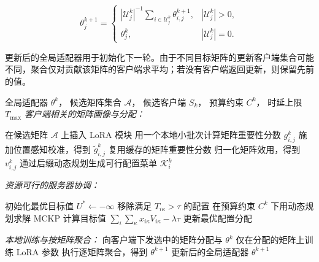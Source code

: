 \documentclass[10pt,conference,letterpaper]{IEEEtran}
\newcommand{\method}{FedMATRIX-LoRA}
\begin{document}
\begin{equation}
 \theta_j^{k+1}
 =
 \begin{cases}
 |\mathcal U_j^k|^{-1}
 \displaystyle\sum_{i\in \mathcal U_j^k}
 \theta_{i,j}^{k+1},
 &
 |\mathcal U_j^k|>0,
 \\[6pt]
 \theta_j^k,
 &
 |\mathcal U_j^k|=0 .
 \end{cases}
 \label{eq:aggregation}
\end{equation}

更新后的全局适配器用于初始化下一轮。由于不同目标矩阵的更新客户端集合可能不同，聚合仅对贡献该矩阵的客户端求平均；若没有客户端返回更新，则保留先前的值。
\begin{algorithm}[t]
\caption{通信轮次 $k$ 中的 \method{}}
\label{alg:fedmatrix}
\footnotesize
\begin{algorithmic}[1]
\Require
全局适配器 \(\theta^k\)，
候选矩阵集合 \(\mathcal A\)，
候选客户端 \(S_k\)，
预算约束 \(C^k\)，
时延上限 \(T_{\max}\)
\Statex \hrulefill
\Statex \textit{客户端相关的矩阵画像与分配：}

        \State 在候选矩阵 \(\mathcal A\) 上插入 LoRA 模块
        \State 用一个本地小批次计算矩阵重要性分数 \(g_{i,j}^k\)
        \State 施加位置感知校准，得到 \(\widetilde g_{i,j}^k\)
    \Else
        \State 复用缓存的矩阵重要性分数
    \EndIf
    \State 归一化矩阵效用，得到 \(v_{i,j}^k\)
    \State 通过后缀动态规划生成可行配置菜单 \(\mathcal K_i^k\)
\EndFor

\Statex \hrulefill
\Statex \textit{资源可行的服务器协调：}

\State 初始化最优目标值 \(U^*\leftarrow -\infty\)
    \State 移除满足 \(T_{i\kappa}>\tau\) 的配置
    \State 在预算约束 \(C^k\) 下用动态规划求解 MCKP
    \State 计算目标值 \(\sum_i\sum_{\kappa}x_{i\kappa}V_{i\kappa}-\lambda\tau\)
        \State 更新最优配置分配
    \EndIf
\EndFor

\Statex \hrulefill
\Statex \textit{本地训练与按矩阵聚合：}
\State 向客户端下发选中的矩阵分配与 \(\theta^k\)
    \State 仅在分配的矩阵上训练 LoRA 参数
\EndFor
\State 执行逐矩阵聚合，得到 \(\theta^{k+1}\)
\State \Return 更新后的全局适配器 \(\theta^{k+1}\)
\end{algorithmic}
\end{algorithm}
\end{document}
